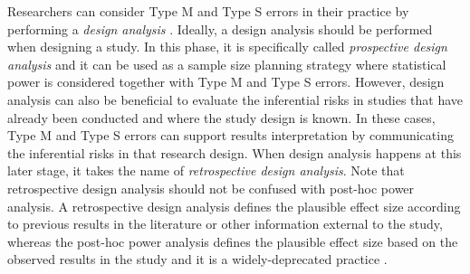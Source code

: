 \documentclass{article}\usepackage[]{graphicx}\usepackage[]{color}
\begin{document}
Researchers can consider Type M and Type S errors in their practice by performing a \emph{design analysis} \parencite{altoeEnhancingStatisticalInference2020, gelmanPowerCalculationsAssessing2014}. Ideally, a design analysis should be performed when designing a study. In this phase, it is specifically called \emph{prospective design analysis} and it can be used as a sample size planning strategy where statistical power is considered together with Type M and Type S errors. However, design analysis can also be beneficial to evaluate the inferential risks in studies that have already been conducted and where the study design is known. In these cases, Type M and Type S errors can support results interpretation by communicating the inferential risks in that research design. When design analysis happens at this later stage, it takes the name of \emph{retrospective design analysis}. Note that retrospective design analysis should not be confused with post-hoc power analysis. A retrospective design analysis defines the plausible effect size according to previous results in the literature or other information external to the study, whereas the post-hoc power analysis defines the plausible effect size based on the observed results in the study and it is a widely-deprecated practice \parencite{goodmanUsePredictedConfidence1994a, gelmanDonCalculatePosthoc2019a}.
\end{document}
